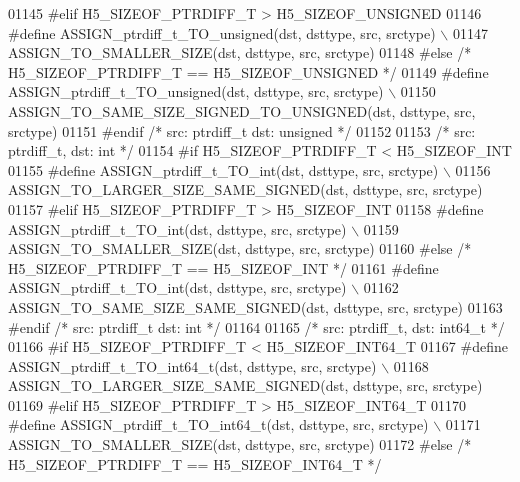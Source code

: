 \begin{DoxyCode}
01145 \textcolor{preprocessor}{#elif H5\_SIZEOF\_PTRDIFF\_T > H5\_SIZEOF\_UNSIGNED}
01146 \textcolor{preprocessor}{    #define ASSIGN\_ptrdiff\_t\_TO\_unsigned(dst, dsttype, src, srctype) \(\backslash\)}
01147 \textcolor{preprocessor}{        ASSIGN\_TO\_SMALLER\_SIZE(dst, dsttype, src, srctype)}
01148 \textcolor{preprocessor}{#else }\textcolor{comment}{/* H5\_SIZEOF\_PTRDIFF\_T == H5\_SIZEOF\_UNSIGNED */}\textcolor{preprocessor}{}
01149 \textcolor{preprocessor}{    #define ASSIGN\_ptrdiff\_t\_TO\_unsigned(dst, dsttype, src, srctype) \(\backslash\)}
01150 \textcolor{preprocessor}{        ASSIGN\_TO\_SAME\_SIZE\_SIGNED\_TO\_UNSIGNED(dst, dsttype, src, srctype)}
01151 \textcolor{preprocessor}{#endif }\textcolor{comment}{/* src: ptrdiff\_t dst: unsigned */}\textcolor{preprocessor}{}
01152 
01153 \textcolor{comment}{/* src: ptrdiff\_t, dst: int */}
01154 \textcolor{preprocessor}{#if H5\_SIZEOF\_PTRDIFF\_T < H5\_SIZEOF\_INT}
01155 \textcolor{preprocessor}{    #define ASSIGN\_ptrdiff\_t\_TO\_int(dst, dsttype, src, srctype) \(\backslash\)}
01156 \textcolor{preprocessor}{        ASSIGN\_TO\_LARGER\_SIZE\_SAME\_SIGNED(dst, dsttype, src, srctype)}
01157 \textcolor{preprocessor}{#elif H5\_SIZEOF\_PTRDIFF\_T > H5\_SIZEOF\_INT}
01158 \textcolor{preprocessor}{    #define ASSIGN\_ptrdiff\_t\_TO\_int(dst, dsttype, src, srctype) \(\backslash\)}
01159 \textcolor{preprocessor}{        ASSIGN\_TO\_SMALLER\_SIZE(dst, dsttype, src, srctype)}
01160 \textcolor{preprocessor}{#else }\textcolor{comment}{/* H5\_SIZEOF\_PTRDIFF\_T == H5\_SIZEOF\_INT */}\textcolor{preprocessor}{}
01161 \textcolor{preprocessor}{    #define ASSIGN\_ptrdiff\_t\_TO\_int(dst, dsttype, src, srctype) \(\backslash\)}
01162 \textcolor{preprocessor}{        ASSIGN\_TO\_SAME\_SIZE\_SAME\_SIGNED(dst, dsttype, src, srctype)}
01163 \textcolor{preprocessor}{#endif }\textcolor{comment}{/* src: ptrdiff\_t dst: int */}\textcolor{preprocessor}{}
01164 
01165 \textcolor{comment}{/* src: ptrdiff\_t, dst: int64\_t */}
01166 \textcolor{preprocessor}{#if H5\_SIZEOF\_PTRDIFF\_T < H5\_SIZEOF\_INT64\_T}
01167 \textcolor{preprocessor}{    #define ASSIGN\_ptrdiff\_t\_TO\_int64\_t(dst, dsttype, src, srctype) \(\backslash\)}
01168 \textcolor{preprocessor}{        ASSIGN\_TO\_LARGER\_SIZE\_SAME\_SIGNED(dst, dsttype, src, srctype)}
01169 \textcolor{preprocessor}{#elif H5\_SIZEOF\_PTRDIFF\_T > H5\_SIZEOF\_INT64\_T}
01170 \textcolor{preprocessor}{    #define ASSIGN\_ptrdiff\_t\_TO\_int64\_t(dst, dsttype, src, srctype) \(\backslash\)}
01171 \textcolor{preprocessor}{        ASSIGN\_TO\_SMALLER\_SIZE(dst, dsttype, src, srctype)}
01172 \textcolor{preprocessor}{#else }\textcolor{comment}{/* H5\_SIZEOF\_PTRDIFF\_T == H5\_SIZEOF\_INT64\_T */}\textcolor{preprocessor}{}

\end{DoxyCode}

